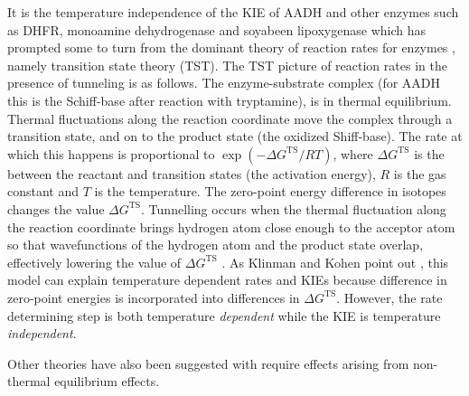 
It is the temperature independence of the KIE of AADH and other enzymes such as DHFR, monoamine dehydrogenase and soyabeen lipoxygenase \cite{glowackiTakingOckhamRazor2012b} which has prompted some to turn from the dominant theory of reaction rates for enzymes \cite{masgrau2004hydrogen, brunoVibrationallyEnhancedTunneling1992, borgisCurveCrossingFormulation1996, antoniouLargeKineticIsotope1997, klinmanbeyond2009}, namely transition state theory \cite{garciavilocaHowEnzymesWork2004} (TST). The TST picture of reaction rates in the presence of tunneling is as follows. The enzyme-substrate complex (for AADH this is the Schiff-base after reaction with tryptamine), is in thermal equilibrium. Thermal fluctuations along the reaction coordinate move the complex through a transition state, and on to the product state (the oxidized Shiff-base). The rate at which this happens is proportional to $\exp{(-\Delta G^{\mathrm{TS}}/RT)}$, where  $\Delta G^{\mathrm{TS}}$ is the between the reactant and transition states (the activation energy), $R$ is the gas constant and $T$ is the temperature. The zero-point energy difference in isotopes changes the value $\Delta G^{\mathrm{TS}}$. Tunnelling occurs when the thermal fluctuation along the reaction coordinate brings hydrogen atom close enough to the acceptor atom so that wavefunctions of the hydrogen atom and the product state overlap, effectively lowering the value of $\Delta G^{\mathrm{TS}}$ \cite{puMultidimensionalTunnelingRecrossing2006}.  As Klinman and Kohen point out \cite{klinmanHydrogenTunnelingLinks2013}, this model can explain temperature dependent rates and KIEs because difference in zero-point energies is incorporated into differences in $\Delta G^{\mathrm{TS}}$. However, the rate determining step is both temperature \emph{dependent} while the KIE is temperature \emph{independent}. 

Other theories have also been suggested with require effects arising from non-thermal equilibrium effects.  


